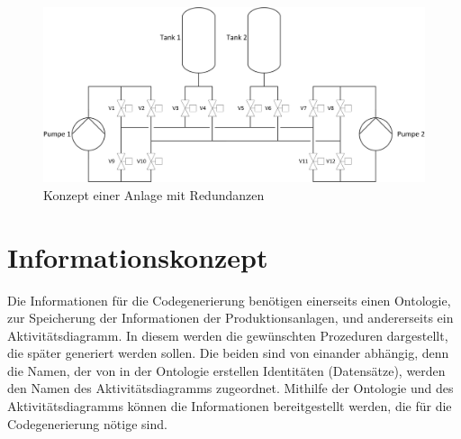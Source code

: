 

\begin{figure}[h!]
		\centering
		\includegraphics[width=1\textwidth]{graphics/konzept/RI_K.png}
		\caption{Konzept einer Anlage mit Redundanzen}
\end{figure}
\section{Informationskonzept}
Die Informationen für die Codegenerierung benötigen einerseits einen Ontologie, zur Speicherung der Informationen der Produktionsanlagen, und andererseits ein Aktivitätsdiagramm. In diesem werden die gewünschten Prozeduren dargestellt, die später generiert werden sollen.
Die beiden sind von einander abhängig, denn die Namen, der von in der Ontologie erstellen Identitäten (Datensätze), werden den Namen des Aktivitätsdiagramms zugeordnet.
Mithilfe der Ontologie und des Aktivitätsdiagramms können die Informationen bereitgestellt werden, die für die Codegenerierung nötige sind.  

